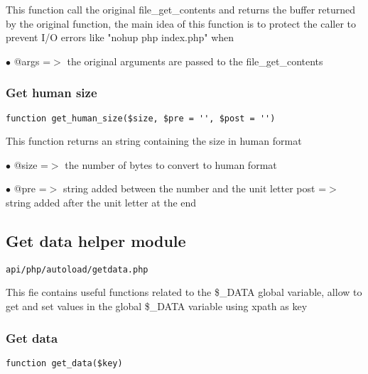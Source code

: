 \documentclass[a4paper]{article}
\begin{document}
This function call the original file\_get\_contents and returns the buffer
returned by the original function, the main idea of this function is to
protect the caller to prevent I/O errors like "nohup php index.php" when

\begin{compactitem}
\item[\color{myblue}$\bullet$] @args =$>$ the original arguments are passed to the file\_get\_contents
\end{compactitem}

\hypertarget{toc144}{}
\subsubsection{Get human size}

\begin{lstlisting}
function get_human_size($size, $pre = '', $post = '')
\end{lstlisting}

This function returns an string containing the size in human format

\begin{compactitem}
\item[\color{myblue}$\bullet$] @size =$>$ the number of bytes to convert to human format
\item[\color{myblue}$\bullet$] @pre  =$>$ string added between the number and the unit letter
post  =$>$ string added after the unit letter at the end
\end{compactitem}

\hypertarget{toc145}{}
\subsection{Get data helper module}

\begin{lstlisting}
api/php/autoload/getdata.php
\end{lstlisting}

This fie contains useful functions related to the \$\_DATA global variable, allow to get and set
values in the global \$\_DATA variable using xpath as key

\hypertarget{toc146}{}
\subsubsection{Get data}

\begin{lstlisting}
function get_data($key)
\end{lstlisting}
\end{document}
